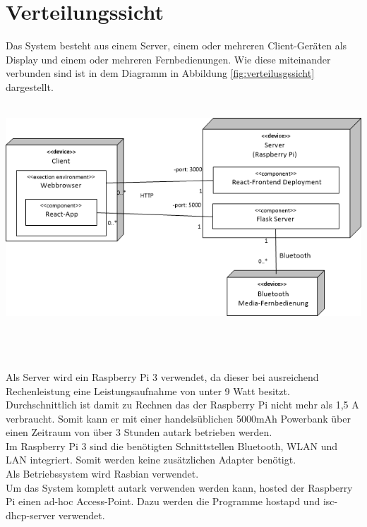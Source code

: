 \chapter{Verteilungssicht}
Das System besteht aus einem Server, einem oder mehreren Client-Geräten als Display und einem oder mehreren Fernbedienungen. Wie diese miteinander verbunden sind ist in dem Diagramm in Abbildung \ref{fig:verteilusgssicht} dargestellt.\\
\\
\begin{minipage}{\textwidth} 
	\centering
	\includegraphics[width=\textwidth]{Bilder/Verteilungssicht.png}\\
	\label{fig:verteilusgssicht}
\end{minipage}
\\
\\
\\
Als Server wird ein Raspberry Pi 3 verwendet, da dieser bei ausreichend Rechenleistung eine Leistungsaufnahme von unter 9 Watt besitzt. Durchschnittlich ist damit zu Rechnen das der Raspberry Pi nicht mehr als 1,5 A verbraucht. Somit kann er mit einer handelsüblichen 5000mAh Powerbank über einen Zeitraum von über 3 Stunden autark betrieben werden. \\
Im Raspberry Pi 3 sind die benötigten Schnittstellen Bluetooth, WLAN und LAN integriert. Somit werden keine zusätzlichen Adapter benötigt.\\
Als Betriebssystem wird Rasbian verwendet.\\
Um das System komplett autark verwenden werden kann, hosted der Raspberry Pi einen ad-hoc Access-Point. Dazu werden die Programme \glqq hostapd\grqq{} und \glqq isc-dhcp-server\grqq{} verwendet. \\
\\
